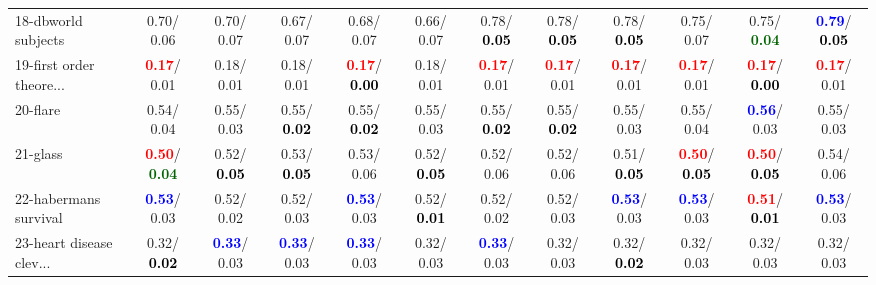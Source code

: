 \begin{table}[h]
\begin{center}
{\begin{tabular}{lc|c|c|c|c|c|c|c|c|c|c}
18-dbworld subjects &   0.70/  0.06 &   0.70/  0.07 &   0.67/  0.07 &   0.68/  0.07 &   0.66/  0.07 &   0.78/\textcolor{black}{\textbf{  0.05}} &   0.78/\textcolor{black}{\textbf{  0.05}} &   0.78/\textcolor{black}{\textbf{  0.05}} &   0.75/  0.07 &   0.75/\textcolor{darkgreen}{\textbf{  0.04}} & \textcolor{blue}{\textbf{  0.79}}/\textcolor{black}{\textbf{  0.05}} \\
19-first order theore... & \textcolor{red}{\textbf{  0.17}}/  0.01 &   0.18/  0.01 &   0.18/  0.01 & \textcolor{red}{\textbf{  0.17}}/\textcolor{black}{\textbf{  0.00}} &   0.18/  0.01 & \textcolor{red}{\textbf{  0.17}}/  0.01 & \textcolor{red}{\textbf{  0.17}}/  0.01 & \textcolor{red}{\textbf{  0.17}}/  0.01 & \textcolor{red}{\textbf{  0.17}}/  0.01 & \textcolor{red}{\textbf{  0.17}}/\textcolor{black}{\textbf{  0.00}} & \textcolor{red}{\textbf{  0.17}}/  0.01 \\
20-flare &   0.54/  0.04 &   0.55/  0.03 &   0.55/\textcolor{black}{\textbf{  0.02}} &   0.55/\textcolor{black}{\textbf{  0.02}} &   0.55/  0.03 &   0.55/\textcolor{black}{\textbf{  0.02}} &   0.55/\textcolor{black}{\textbf{  0.02}} &   0.55/  0.03 &   0.55/  0.04 & \textcolor{blue}{\textbf{  0.56}}/  0.03 &   0.55/  0.03 \\
21-glass & \textcolor{red}{\textbf{  0.50}}/\textcolor{darkgreen}{\textbf{  0.04}} &   0.52/\textcolor{black}{\textbf{  0.05}} &   0.53/\textcolor{black}{\textbf{  0.05}} &   0.53/  0.06 &   0.52/\textcolor{black}{\textbf{  0.05}} &   0.52/  0.06 &   0.52/  0.06 &   0.51/\textcolor{black}{\textbf{  0.05}} & \textcolor{red}{\textbf{  0.50}}/\textcolor{black}{\textbf{  0.05}} & \textcolor{red}{\textbf{  0.50}}/\textcolor{black}{\textbf{  0.05}} &   0.54/  0.06 \\ \hline
22-habermans survival & \textcolor{blue}{\textbf{  0.53}}/  0.03 &   0.52/  0.02 &   0.52/  0.03 & \textcolor{blue}{\textbf{  0.53}}/  0.03 &   0.52/\textcolor{black}{\textbf{  0.01}} &   0.52/  0.02 &   0.52/  0.03 & \textcolor{blue}{\textbf{  0.53}}/  0.03 & \textcolor{blue}{\textbf{  0.53}}/  0.03 & \textcolor{red}{\textbf{  0.51}}/\textcolor{black}{\textbf{  0.01}} & \textcolor{blue}{\textbf{  0.53}}/  0.03 \\
23-heart disease clev... &   0.32/\textcolor{black}{\textbf{  0.02}} & \textcolor{blue}{\textbf{  0.33}}/  0.03 & \textcolor{blue}{\textbf{  0.33}}/  0.03 & \textcolor{blue}{\textbf{  0.33}}/  0.03 &   0.32/  0.03 & \textcolor{blue}{\textbf{  0.33}}/  0.03 &   0.32/  0.03 &   0.32/\textcolor{black}{\textbf{  0.02}} &   0.32/  0.03 &   0.32/  0.03 &   0.32/  0.03 \\

\end{tabular}}
\end{center}
\end{table}
